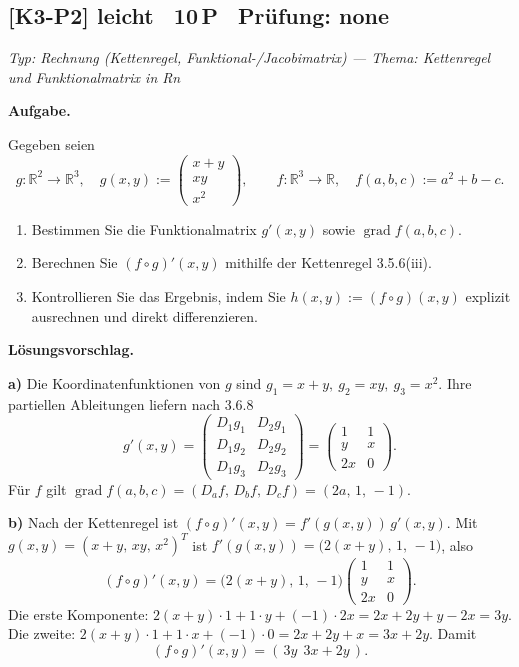 \documentclass[a4paper,11pt]{article}
\begin{document}
\subsection*{[K3-P2] \normalfont leicht \textbullet\ 10\,P \textbullet\ Pr\"ufung: none}
\textit{Typ: Rechnung (Kettenregel, Funktional-/Jacobimatrix)  ---  Thema: Kettenregel und Funktionalmatrix in Rn}\par\smallskip
\textbf{Aufgabe.}\par
Gegeben seien
\[
g:\mathbb{R}^2\to\mathbb{R}^3,\quad g(x,y):=\begin{pmatrix}x+y\\ xy\\ x^2\end{pmatrix},\qquad f:\mathbb{R}^3\to\mathbb{R},\quad f(a,b,c):=a^2+b-c .
\]
\begin{enumerate}[label=\alph*)]
\item Bestimmen Sie die Funktionalmatrix $g'(x,y)$ sowie $\operatorname{grad} f(a,b,c)$.
\item Berechnen Sie $(f\circ g)'(x,y)$ mithilfe der Kettenregel 3.5.6(iii).
\item Kontrollieren Sie das Ergebnis, indem Sie $h(x,y):=(f\circ g)(x,y)$ explizit ausrechnen und direkt differenzieren.
\end{enumerate}\par\smallskip
\textbf{L\"osungsvorschlag.}\par
\textbf{a)} Die Koordinatenfunktionen von $g$ sind $g_1=x+y,\ g_2=xy,\ g_3=x^2$. Ihre partiellen Ableitungen liefern nach 3.6.8
\[
g'(x,y)=\begin{pmatrix}D_1g_1 & D_2g_1\\ D_1g_2 & D_2g_2\\ D_1g_3 & D_2g_3\end{pmatrix}=\begin{pmatrix}1 & 1\\ y & x\\ 2x & 0\end{pmatrix}.
\]
F\"ur $f$ gilt $\operatorname{grad} f(a,b,c)=(D_a f,\,D_b f,\,D_c f)=(2a,\,1,\,-1)$.

\textbf{b)} Nach der Kettenregel ist $(f\circ g)'(x,y)=f'(g(x,y))\,g'(x,y)$. Mit $g(x,y)=(x+y,\,xy,\,x^2)^{T}$ ist $f'(g(x,y))=\bigl(2(x+y),\,1,\,-1\bigr)$, also
\[
(f\circ g)'(x,y)=\bigl(2(x+y),\,1,\,-1\bigr)\begin{pmatrix}1 & 1\\ y & x\\ 2x & 0\end{pmatrix}.
\]
Die erste Komponente: $2(x+y)\cdot1+1\cdot y+(-1)\cdot 2x = 2x+2y+y-2x=3y$. Die zweite: $2(x+y)\cdot1+1\cdot x+(-1)\cdot0=2x+2y+x=3x+2y$. Damit
\[
(f\circ g)'(x,y)=(\,3y\ \ 3x+2y\,).
\]
\end{document}
